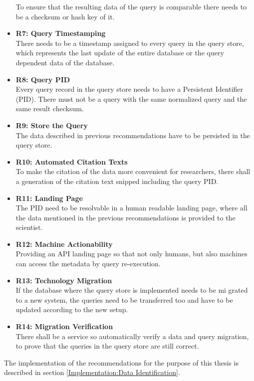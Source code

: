 \documentclass[draft,final]{vutinfth} %
\begin{document}
\begin{itemize}
	To ensure that the resulting data of the query is comparable there needs to be a checksum or hash key of it. 
	\item \textbf{R7: Query Timestamping} \\
	There needs to be a timestamp assigned to every query in the query store, which represents the last update of the entire database or the query dependent data of the database.
	\item \textbf{R8: Query PID}\\
	Every query record in the query store needs to have a Persistent Identifier (PID). There must not be a query with the same normalized query and the same result checksum. 
	\item \textbf{R9: Store the Query} \\
	The data described in previous recommendations have to be persisted in the query store.
	\item \textbf{R10: Automated Citation Texts} \\
	To make the citation of the data more convenient for researchers, there shall a generation of the citation text snipped including the query PID.
	\item \textbf{R11: Landing Page} \\
	The PID need to be resolvable in a human readable landing page, where all the data mentioned in the previous recommendations is provided to the scientist.
	\item \textbf{R12: Machine Actionability} \\
	Providing an API landing page so that not only humans, but also machines can access the metadata by query re-execution.
	\item \textbf{R13: Technology Migration} \\
	If the database where the query store is implemented needs to be mi grated to a new system, the queries need to be transferred too and have to be updated according to the new setup.
	\item \textbf{R14: Migration Verification} \\
	There shall be a service so automatically verify a data and query migration, to prove that the queries in the query store are still correct. 
\end{itemize}
 The implementation of the recommendations for the purpose of this thesis is described in section \ref{Implementation:Data Identification}. 
\end{document}
